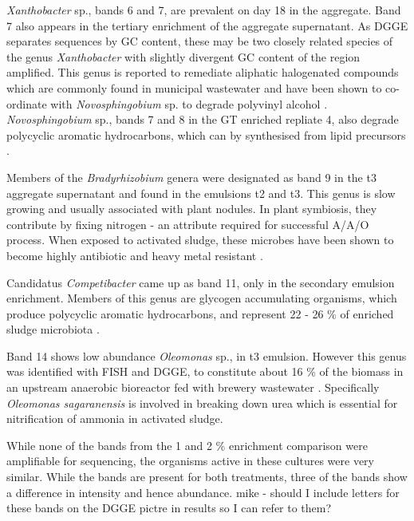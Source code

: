 \documentclass[11pt]{article}
\begin{document}
\emph{Xanthobacter} sp., bands 6 and 7, are prevalent on day 18 in the aggregate. Band 7 also appears in the tertiary enrichment of the aggregate supernatant. As DGGE separates sequences by GC content, these may be two closely related species of the genus \emph{Xanthobacter} with slightly divergent GC content of the region amplified. This genus is reported to remediate aliphatic halogenated compounds which are commonly found in municipal wastewater \cite{janssen1985degradation} and have been shown to co-ordinate with \emph{Novosphingobium} sp. to degrade polyvinyl alcohol \cite{rong2009symbiotic}. \emph{Novosphingobium} sp., bands 7 and 8 in the GT enriched repliate 4, also degrade polycyclic aromatic hydrocarbons, which can by synthesised from lipid precursors \cite{addison2007novosphingobium}.


Members of the \emph{Bradyrhizobium} genera were designated as band 9 in the t3 aggregate supernatant and found in the emulsions t2 and t3. This genus is slow growing \cite{rebah2002wastewater} and usually associated with plant nodules. In plant symbiosis, they contribute by fixing nitrogen - an attribute required for successful A/A/O process. When exposed to activated sludge, these microbes have been shown to become highly antibiotic and heavy metal resistant \cite{ahmad17samiullah}.


Candidatus \emph{Competibacter} came up as band 11, only in the secondary emulsion enrichment. Members of this genus are glycogen accumulating organisms, which produce polycyclic aromatic hydrocarbons, and represent 22 - 26 \% of enriched sludge microbiota \cite{bengtsson2008production,lemaire2008microbial}. 


Band 14 shows low abundance \emph{Oleomonas} sp., in t3 emulsion. However this genus was identified with FISH and DGGE, to constitute about 16 \% of the biomass in an upstream anaerobic bioreactor fed with brewery wastewater \cite{fernandez2008analysis}. Specifically \emph{Oleomonas sagaranensis} is involved in breaking down urea \cite{kanamori2005allophanate,kanamori2004enzymatic} which is essential for nitrification of ammonia in activated sludge.


While none of the bands from the 1 and 2 \% enrichment comparison were amplifiable for sequencing, the organisms active in these cultures were very similar. While the bands are present for both treatments, three of the bands show a difference in intensity and hence abundance.
mike - should I include letters for these bands on the DGGE pictre in results so I can refer to them?
\end{document}
